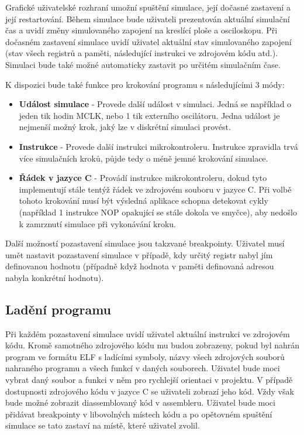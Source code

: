 Grafické uživatelské rozhraní umožní spuštění simulace, její dočasné zastavení a její restartování. Během simulace bude uživateli prezentován aktuální simulační čas a uvidí změny simulovaného zapojení na kreslící ploše a osciloskopu. Při dočasném zastavení simulace uvidí uživatel aktuální
stav simulovaného zapojení (stav všech registrů a paměti, následující instrukci ve zdrojovém kódu atd.). Simulaci bude také možné automaticky zastavit po určitém simulačním čase.

K dispozici bude také funkce pro krokování programu s následujícími 3 módy:

\begin{itemize}
\item \textbf{Událost simulace} - Provede další událost v simulaci. Jedná se například o jeden tik hodin MCLK, nebo 1 tik externího oscilátoru. Jedna událost je nejmenší možný krok, jaký lze v diskrétní simulaci provést.
\item \textbf{Instrukce} - Provede další instrukci mikrokontroleru. Instrukce zpravidla trvá více simulačních kroků, půjde tedy o méně jemné krokování simulace.
\item \textbf{Řádek v jazyce C} - Provádí instrukce mikrokontroleru, dokud tyto implementují stále tentýž řádek ve zdrojovém souboru v jazyce C. Při volbě tohoto krokování musí být výsledná aplikace schopna detekovat cykly (například 1 instrukce NOP opakující se stále dokola ve smyčce), aby nedošlo k zamrznutí simulace při vykonávání kroku.
\end{itemize}

Další možností pozastavení simulace jsou takzvané breakpointy. Uživatel musí umět nastavit pozastavení simulace v případě, kdy určitý registr nabyl jím definovanou hodnotu (případně když hodnota v paměti definovaná adresou nabyla konkrétní hodnotu).

\subsection{Ladění programu}

Při každém pozastavení simulace uvidí uživatel aktuální instrukci ve zdrojovém kódu. Kromě samotného zdrojového kódu mu budou zobrazeny, pokud byl nahrán program ve formátu ELF s ladícími symboly, názvy všech zdrojových souborů nahraného programu a všech funkcí v daných souborech. Uživatel bude moci vybrat daný soubor a funkci v něm pro rychlejší orientaci v projektu. V případě dostupnosti zdrojového kódu v jazyce C se uživateli zobrazí jeho kód. Vždy však bude možné zobrazit diassemblovaný kód v assembleru. Uživatel bude moci přidávat breakpointy v libovolných místech kódu a po opětovném spuštění simulace se tato zastaví na místě, které uživatel zvolil.

